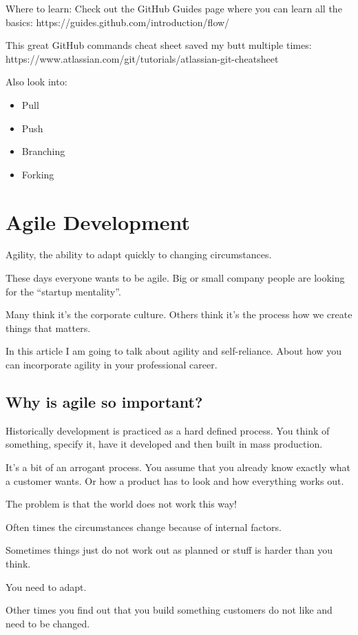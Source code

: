 \documentclass[12pt, numbers=noenddot]{scrreprt} %
\begin{document}
Where to learn:
Check out the GitHub Guides page where you can learn all the basics: https://guides.github.com/introduction/flow/

This great GitHub commands cheat sheet saved my butt multiple times: https://www.atlassian.com/git/tutorials/atlassian-git-cheatsheet

Also look into:
\begin{itemize}
\item Pull
\item Push
\item Branching
\item Forking
\end{itemize}


\chapter{Agile Development}
Agility, the ability to adapt quickly to changing circumstances.

These days everyone wants to be agile. Big or small company people are looking for the “startup mentality”.

Many think it’s the corporate culture. Others think it’s the process how we create things that matters.

In this article I am going to talk about agility and self-reliance. About how you can incorporate agility in your professional career.

\section{Why is agile so important?}
Historically development is practiced as a hard defined process. You think of something, specify it, have it developed and then built in mass production.

It’s a bit of an arrogant process. You assume that you already know exactly what a customer wants. Or how a product has to look and how everything works out.

The problem is that the world does not work this way!

Often times the circumstances change because of internal factors.

Sometimes things just do not work out as planned or stuff is harder than you think.

You need to adapt.

Other times you find out that you build something customers do not like and need to be changed.
\end{document}
